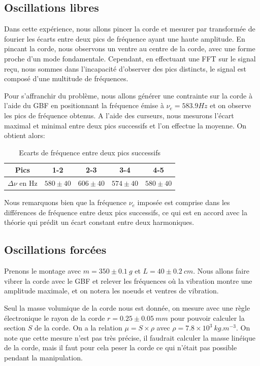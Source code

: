\documentclass[11pt]{article}
\begin{document}
\subsection{Oscillations libres}
Dans cette expérience, nous allons pincer la corde et mesurer par transformée de fourier les écarts entre deux pics de fréquence ayant une haute amplitude.
En pincant la corde, nous observons un ventre au centre de la corde, avec une forme proche d'un mode fondamentale. Cependant, en effectuant une FFT sur le signal reçu,
nous sommes dans l'incapacité d'observer des pics distincts, le signal est composé d'une multitude de fréquences.

Pour s'affranchir du problème, nous allons générer une contrainte sur la corde à l'aide du GBF en positionnant la fréquence émise à $\nu_e = 583.9 Hz$ et on observe
les pics de fréquence obtenus. A l'aide des curseurs, nous mesurons l'écart maximal et minimal entre deux pics successifs et l'on effectue la moyenne. On obtient alors:

\begin{table}[h!]
	\centering
	\begin{tabular}{||c c c c c||} 
		\hline
		Pics & 1-2 & 2-3 & 3-4 & 4-5 \\
		\hline
        $\Delta \nu$ en Hz & $580 \pm 40$ & $606 \pm 40$ & $574 \pm 40$ & $580 \pm 40$ \\
		\hline
	\end{tabular}
	\caption{Ecarts de fréquence entre deux pics successifs}
	\label{table:1}
\end{table}

Nous remarquons bien que la fréquence $\nu_e$ imposée est comprise dans les différences de fréquence entre deux pics successifs, ce qui est en accord avec la théorie qui prédit 
un écart constant entre deux harmoniques.

\break
\subsection{Oscillations forcées}
Prenons le montage avec $m=350 \pm 0.1 \ g$ et $L=40 \pm 0.2 \ cm$. Nous allons faire vibrer la corde avec le GBF et relever les fréquences où la vibration montre une amplitude
maximale, et on notera les noeuds et ventres de vibration.

Seul la masse volumique de la corde nous est donnée, on mesure avec une règle électronique le rayon de la corde $r=0.25 \pm  0.05 \ mm$ pour pouvoir calculer la section $S$ de la corde. On a la relation $\mu= S \times \rho$ avec $\rho = 7.8 \times 10^3 \ kg.m^{-3}$.
On note que cette mesure n'est pas très précise, il faudrait calculer la masse linéique de la corde, mais il faut pour cela peser la corde ce qui n'était pas possible pendant la manipulation.
\end{document}
